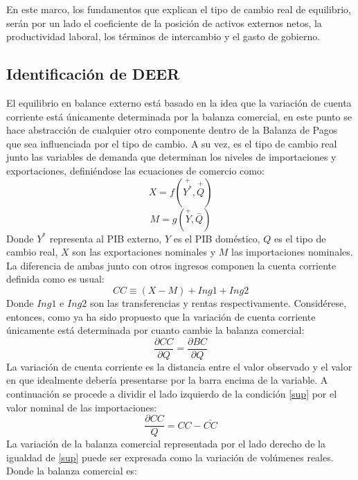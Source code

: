 \documentclass[12pt,letterpaper]{article}
\begin{document}
En este marco, los fundamentos que explican el tipo de cambio real de equilibrio, serán por un lado el coeficiente de la posición de activos externos netos, la productividad laboral, los términos de intercambio y el gasto de gobierno.  

\subsection*{Identificación de DEER}

El equilibrio en balance externo está basado en la idea que la variación de cuenta corriente está únicamente determinada por la balanza comercial, en este punto se hace abstracción de cualquier otro componente dentro de la Balanza de Pagos que sea influenciada por el tipo de cambio. A su vez, es el tipo de cambio real junto las variables de demanda que determinan los niveles de importaciones y exportaciones, definiéndose las ecuaciones de comercio como:
\begin{equation}\label{X}
X=f(\overset{+}{Y^*},\overset{+}{Q})
\end{equation}
\begin{equation}\label{M}
M=g(\overset{+}{Y},\overset{-}{Q})
\end{equation}
Donde $Y^*$ representa al PIB externo, $Y$ es el PIB doméstico, $Q$ es el tipo de cambio real, $X$ son las exportaciones nominales y $M$ las importaciones nominales.
La diferencia de ambas junto con otros ingresos componen la cuenta corriente definida como es usual:
\begin{equation}\label{CC}
CC\equiv(X-M)+Ing1+Ing2
\end{equation}
Donde $Ing1$ e $Ing2$ son las transferencias y rentas respectivamente.
Considérese, entonces, como ya ha sido propuesto que la variación de cuenta corriente únicamente está determinada por cuanto cambie la balanza comercial:
\begin{equation}\label{sup}
\frac{\partial CC}{\partial Q}=\frac{\partial BC}{\partial Q}
\end{equation}
La variación de cuenta corriente es la distancia entre el valor observado y el valor en que idealmente debería presentarse por la barra encima de la variable. A continuación se procede a dividir el lado izquierdo de la condición \ref{sup} por el valor nominal de las importaciones:
\begin{equation}\label{dcc}
\frac{\partial CC}{Q}=CC-\bar{CC}
\end{equation}
La variación de la balanza comercial representada por el lado derecho de la igualdad de \ref{sup} puede ser expresada como la variación de volúmenes reales. Donde la balanza comercial es:
\end{document}
